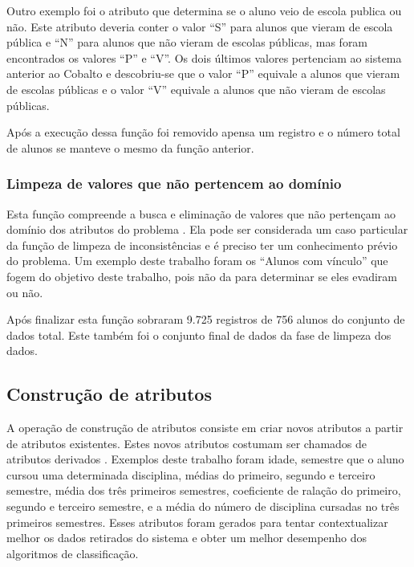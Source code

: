 \documentclass[diss,capa]{texufpel}
\begin{document}
Outro exemplo foi o atributo que determina se o aluno veio de escola publica ou não. Este atributo deveria conter o valor ``S'' para alunos que vieram de escola pública e ``N'' para alunos que não vieram de escolas públicas, mas foram encontrados os valores ``P'' e ``V''. Os dois últimos valores pertenciam ao sistema anterior ao Cobalto e descobriu-se que o valor ``P'' equivale a alunos que vieram de escolas públicas e o valor ``V'' equivale a alunos que não vieram de escolas públicas.

Após a execução dessa função foi removido apensa um registro e o número total de alunos se manteve o mesmo da função anterior.

\subsubsection{Limpeza de valores que não pertencem ao domínio}

Esta função compreende a busca e eliminação de valores que não pertençam ao domínio dos atributos do problema \cite{goldschmidt2015data}. 
Ela pode ser considerada um caso particular da função de limpeza de inconsistências e é preciso ter um conhecimento prévio do problema.
Um exemplo deste trabalho foram os ``Alunos com vínculo'' que fogem do objetivo deste trabalho, pois não da para determinar se eles evadiram ou não.

Após finalizar esta função sobraram 9.725 registros de 756 alunos do conjunto de dados total. Este também foi o conjunto final de dados da fase de limpeza dos dados.

\subsection{Construção de atributos}
\label{subsec:construcao-de-atributos}

A operação de construção de atributos consiste em criar novos atributos a partir de atributos existentes. Estes novos atributos costumam ser chamados de atributos derivados  \cite{goldschmidt2015data}.
Exemplos deste trabalho foram idade, semestre que o aluno cursou uma determinada disciplina, médias do primeiro, segundo e terceiro semestre, média dos três primeiros semestres, coeficiente de ralação do primeiro, segundo e terceiro semestre, e a média do número de disciplina cursadas no três primeiros semestres.
Esses atributos foram gerados para tentar contextualizar melhor os dados retirados do sistema e obter um melhor desempenho dos algoritmos de classificação.
\end{document}
